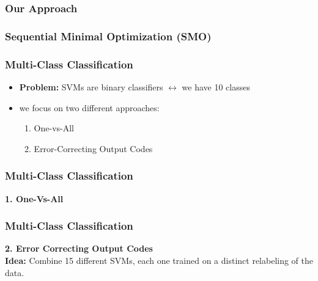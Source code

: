 \documentclass[12pt, compress]{beamer}
\newcommand{\titleB}{Our Approach}
\newcommand{\titleC}{Sequential Minimal Optimization (SMO)}
\newcommand{\titleD}{Multi-Class Classification}
\begin{document}
\begin{frame}
  \frametitle{\titleB}
	
\end{frame}


\begin{frame}
  \frametitle{\titleC}

\end{frame}


\begin{frame}
  \frametitle{\titleD}
	\begin{itemize}
		\item \textbf{Problem:} SVMs are binary classifiers $\leftrightarrow$ we have 10 classes
		\item we focus on two different approaches: 
		\begin{enumerate}
			\item One-vs-All 
			\item Error-Correcting Output Codes
		\end{enumerate}
	\end{itemize}
\end{frame}



\begin{frame}
  \frametitle{\titleD}
	\textbf{\alert{1. One-Vs-All}}
\end{frame}



\begin{frame}
  \frametitle{\titleD}

	\textbf{\alert{2. Error Correcting Output Codes}}\\
	\textbf{Idea:} Combine 15 different SVMs, each one trained on a distinct relabeling of the data.
	\begin{table}[ht!]
		\centering
		\label{Codewords}
		\scalebox{0.8}{
		
		}
	\end{table}  
\end{frame}
\end{document}
